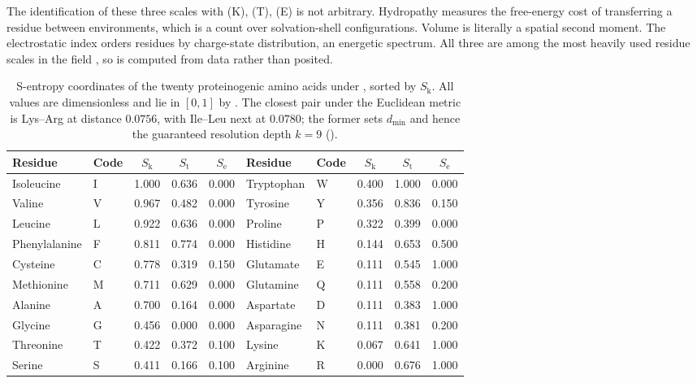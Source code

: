 \documentclass[11pt,twocolumn,a4paper]{article}
\theoremstyle{thmstyle}
\theoremstyle{definition}
\theoremstyle{remark}
\newcommand{\Sk}{S_{\mathrm{k}}}
\newcommand{\St}{S_{\mathrm{t}}}
\newcommand{\Se}{S_{\mathrm{e}}}
\begin{document}
The identification of these three scales with (K), (T), (E) is not
arbitrary. Hydropathy measures the free-energy cost of transferring a
residue between environments, which is a count over solvation-shell
configurations. Volume is literally a spatial second moment. The
electrostatic index orders residues by charge-state distribution, an
energetic spectrum. All three are among the most heavily used residue
scales in the field \citep{grantham1974,kawashima2008}, so
 is computed from data rather than posited.

\begin{table}[t]
\centering
\small
\caption{S-entropy coordinates of the twenty proteinogenic amino acids
under , sorted by $\Sk$. All values are
dimensionless and lie in $[0,1]$ by . The closest
pair under the Euclidean metric is Lys--Arg at distance $0.0756$, with
Ile--Leu next at $0.0780$; the former sets $d_{\min}$ and hence the
guaranteed resolution depth $k = 9$ ().}
\label{tab:aa}
\begin{tabular}{llccc@{\qquad\qquad}llccc}
\toprule
Residue & Code & $\Sk$ & $\St$ & $\Se$ &
Residue & Code & $\Sk$ & $\St$ & $\Se$ \\
\midrule
Isoleucine    & I & 1.000 & 0.636 & 0.000 & Tryptophan & W & 0.400 & 1.000 & 0.000 \\
Valine        & V & 0.967 & 0.482 & 0.000 & Tyrosine   & Y & 0.356 & 0.836 & 0.150 \\
Leucine       & L & 0.922 & 0.636 & 0.000 & Proline    & P & 0.322 & 0.399 & 0.000 \\
Phenylalanine & F & 0.811 & 0.774 & 0.000 & Histidine  & H & 0.144 & 0.653 & 0.500 \\
Cysteine      & C & 0.778 & 0.319 & 0.150 & Glutamate  & E & 0.111 & 0.545 & 1.000 \\
Methionine    & M & 0.711 & 0.629 & 0.000 & Glutamine  & Q & 0.111 & 0.558 & 0.200 \\
Alanine       & A & 0.700 & 0.164 & 0.000 & Aspartate  & D & 0.111 & 0.383 & 1.000 \\
Glycine       & G & 0.456 & 0.000 & 0.000 & Asparagine & N & 0.111 & 0.381 & 0.200 \\
Threonine     & T & 0.422 & 0.372 & 0.100 & Lysine     & K & 0.067 & 0.641 & 1.000 \\
Serine        & S & 0.411 & 0.166 & 0.100 & Arginine   & R & 0.000 & 0.676 & 1.000 \\
\bottomrule
\end{tabular}
\end{table}
\end{document}

